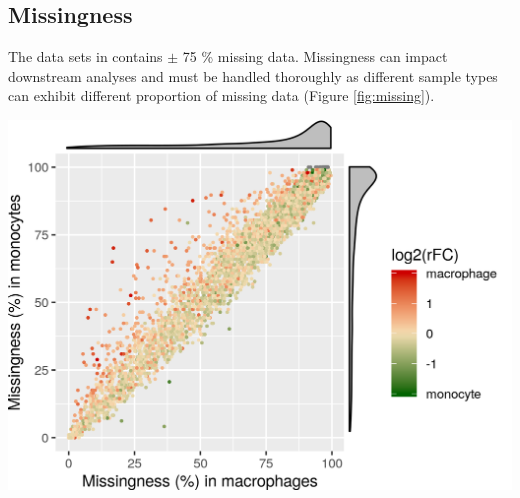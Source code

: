 \documentclass{article}
\begin{document}
\begin{multicols}{2}
\begin{minipage}[t]{\linewidth}
\end{minipage}
  
\noindent
\vspace{0.4cm}
\begin{minipage}[h]{0.37\linewidth}
  \subsection*{Missingness}
  \large
  The data sets in \cite{Specht2019-jm} contains $\pm$ 75 \% missing data. Missingness can impact downstream analyses and must be handled thoroughly as different sample types can exhibit different proportion of missing data (Figure \ref{fig:missing}).
\end{minipage}
\hspace{0.4cm}
\begin{minipage}[h]{0.6\linewidth}
  \begin{center}
    \includegraphics[width=\linewidth]{figs/missing.png}
  \end{center}
\end{minipage}
\noindent
\begin{minipage}[h]{\linewidth}
  \label{fig:missing}
\end{minipage}

\noindent
\begin{minipage}[t]{\linewidth}

\end{minipage}
\end{multicols}
\end{document}
